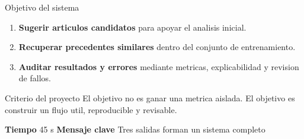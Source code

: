 \documentclass[aspectratio=169,10pt]{beamer}
\newcommand{\slidemeta}[2]{
  \vfill
  {\scriptsize\color{Muted}\textbf{Tiempo} #1 \hfill \textbf{Mensaje clave} #2}
}
\begin{document}
\begin{frame}{Objetivo del sistema}
  \begin{enumerate}
    \item \textbf{Sugerir articulos candidatos} para apoyar el analisis inicial.
    \item \textbf{Recuperar precedentes similares} dentro del conjunto de entrenamiento.
    \item \textbf{Auditar resultados y errores} mediante metricas, explicabilidad y revision de fallos.
  \end{enumerate}
  \vspace{0.35cm}
  \begin{block}{Criterio del proyecto}
    El objetivo no es ganar una metrica aislada. El objetivo es construir un flujo util, reproducible y revisable.
  \end{block}
  \slidemeta{45 s}{Tres salidas forman un sistema completo}
\end{frame}
\end{document}
